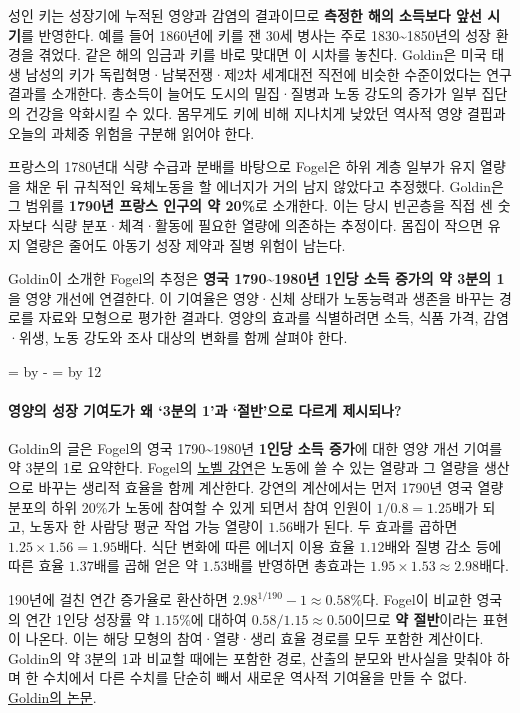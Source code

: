 \documentclass[10pt,a4paper]{article}
\newcommand{\ReserveQuestionSpace}{%
  \par\begingroup
  \dimen0=\pagegoal \advance\dimen0 by -\pagetotal
  \dimen2=\baselineskip \multiply\dimen2 by 12
  \ifdim\dimen0<\dimen2 \newpage\fi
  \endgroup}
\begin{document}
성인 키는 성장기에 누적된 영양과 감염의 결과이므로 \textbf{측정한 해의 소득보다 앞선 시기}를 반영한다. 예를 들어 1860년에 키를 잰 30세 병사는 주로 1830\textasciitilde{}1850년의 성장 환경을 겪었다. 같은 해의 임금과 키를 바로 맞대면 이 시차를 놓친다. Goldin은 미국 태생 남성의 키가 독립혁명·남북전쟁·제2차 세계대전 직전에 비슷한 수준이었다는 연구 결과를 소개한다. 총소득이 늘어도 도시의 밀집·질병과 노동 강도의 증가가 일부 집단의 건강을 악화시킬 수 있다. 몸무게도 키에 비해 지나치게 낮았던 역사적 영양 결핍과 오늘의 과체중 위험을 구분해 읽어야 한다.\par

프랑스의 1780년대 식량 수급과 분배를 바탕으로 Fogel은 하위 계층 일부가 유지 열량을 채운 뒤 규칙적인 육체노동을 할 에너지가 거의 남지 않았다고 추정했다. Goldin은 그 범위를 \textbf{1790년 프랑스 인구의 약 20\%}로 소개한다. 이는 당시 빈곤층을 직접 센 숫자보다 식량 분포·체격·활동에 필요한 열량에 의존하는 추정이다. 몸집이 작으면 유지 열량은 줄어도 아동기 성장 제약과 질병 위험이 남는다.\par

Goldin이 소개한 Fogel의 추정은 \textbf{영국 1790\textasciitilde{}1980년 1인당 소득 증가의 약 3분의 1}을 영양 개선에 연결한다. 이 기여율은 영양·신체 상태가 노동능력과 생존을 바꾸는 경로를 자료와 모형으로 평가한 결과다. 영양의 효과를 식별하려면 소득, 식품 가격, 감염·위생, 노동 강도와 조사 대상의 변화를 함께 살펴야 한다.\par

\ReserveQuestionSpace
\paragraph{영양의 성장 기여도가 왜 ‘3분의 1’과 ‘절반’으로 다르게 제시되나?}
Goldin의 글은 Fogel의 영국 1790\textasciitilde{}1980년 \textbf{1인당 소득 증가}에 대한 영양 개선 기여를 약 3분의 1로 요약한다. Fogel의 \href{https://www.nobelprize.org/uploads/2018/06/fogel-lecture.pdf}{노벨 강연}은 노동에 쓸 수 있는 열량과 그 열량을 생산으로 바꾸는 생리적 효율을 함께 계산한다. 강연의 계산에서는 먼저 1790년 영국 열량 분포의 하위 20\%가 노동에 참여할 수 있게 되면서 참여 인원이 $1/0.8=1.25$배가 되고, 노동자 한 사람당 평균 작업 가능 열량이 $1.56$배가 된다. 두 효과를 곱하면 $1.25\times1.56=1.95$배다. 식단 변화에 따른 에너지 이용 효율 $1.12$배와 질병 감소 등에 따른 효율 $1.37$배를 곱해 얻은 약 $1.53$배를 반영하면 총효과는 $1.95\times1.53\approx2.98$배다.\par

190년에 걸친 연간 증가율로 환산하면 $2.98^{1/190}-1\approx0.58\%$다. Fogel이 비교한 영국의 연간 1인당 성장률 약 $1.15\%$에 대하여 $0.58/1.15\approx0.50$이므로 \textbf{약 절반}이라는 표현이 나온다. 이는 해당 모형의 참여·열량·생리 효율 경로를 모두 포함한 계산이다. Goldin의 약 3분의 1과 비교할 때에는 포함한 경로, 산출의 분모와 반사실을 맞춰야 하며 한 수치에서 다른 수치를 단순히 빼서 새로운 역사적 기여율을 만들 수 없다. \href{https://goldin.scholars.harvard.edu/sites/g/files/omnuum5966/files/goldin/files/cliometrics.pdf}{Goldin의 논문}.\par
\end{document}
